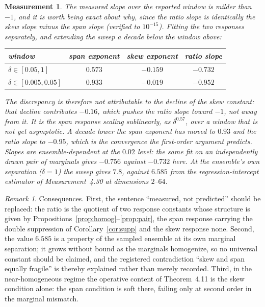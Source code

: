 \documentclass[11pt]{article}
\newtheorem{measurement}{Measurement}
\theoremstyle{remark}
\newtheorem{remark}{Remark}
\begin{document}
\begin{measurement}
The measured slope over the reported window is milder than $-1$, and it is worth being exact
about why, since the ratio slope is identically the skew slope minus the span slope (verified to
$10^{-15}$). Fitting the two responses separately, and extending the sweep a decade below the
window above:
\begin{center}
\begin{tabular}{@{}lccc@{}}
\toprule
window & span exponent & skew exponent & ratio slope\\
\midrule
$\delta\in[0.05,1]$    & $0.573$ & $-0.159$ & $-0.732$\\
$\delta\in[0.005,0.05]$ & $0.933$ & $-0.019$ & $-0.952$\\
\bottomrule
\end{tabular}
\end{center}
The discrepancy is therefore \emph{not} attributable to the decline of the skew constant: that
decline contributes $-0.16$, which pushes the ratio slope toward $-1$, not away from it. It is
the span response scaling sublinearly, as $\delta^{0.57}$, over a window that is not yet
asymptotic. A decade lower the span exponent has moved to $0.93$ and the ratio slope to $-0.95$,
which is the convergence the first-order argument predicts. Slopes are ensemble-dependent at the
$0.02$ level: the same fit on an independently drawn pair of marginals gives $-0.756$ against
$-0.732$ here. At the ensemble's own
separation ($\delta=1$) the sweep gives $7.8$, against $6.585$ from the regression-intercept
estimator of Measurement~4.30 at dimensions $2$--$64$.
\end{measurement}

\begin{remark}
Consequences. First, the sentence ``measured, not predicted'' should be replaced: the ratio is
the quotient of two response constants whose structure is given by
Propositions~\ref{prop:homog}--\ref{prop:pair}, the span response carrying the double suppression
of Corollary~\ref{cor:supp} and the skew response none. Second, the value $6.585$ is a property
of the sampled ensemble at its own marginal separation; it grows without bound as the marginals
homogenize, so no universal constant should be claimed, and the registered contradiction ``skew
and span equally fragile'' is thereby explained rather than merely recorded. Third, in the
near-homogeneous regime the operative content of Theorem~4.11 is the skew condition alone: the
span condition is soft there, failing only at second order in the marginal mismatch.
\end{remark}
\end{document}
